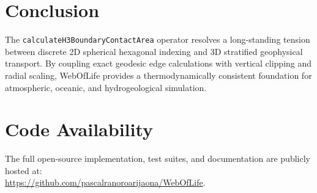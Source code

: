 \documentclass[11pt,a4paper]{article}
\theoremstyle{definition}
\begin{document}
\section{Conclusion}

The \texttt{calculateH3BoundaryContactArea} operator resolves a long-standing tension between discrete 2D spherical hexagonal indexing and 3D stratified geophysical transport. By coupling exact geodesic edge calculations with vertical clipping and radial scaling, WebOfLife provides a thermodynamically consistent foundation for atmospheric, oceanic, and hydrogeological simulation.

\section*{Code Availability}
The full open-source implementation, test suites, and documentation are publicly hosted at:\\
\url{https://github.com/pascalranoroarijaona/WebOfLife}.
\end{document}
